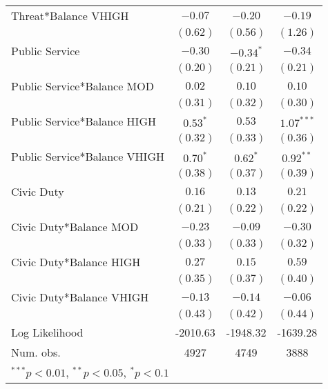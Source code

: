 \documentclass[12pt,titlepage]{article}
\begin{document}
\begin{table}[htbp]
\begin{center}
\begin{tabular}{|l|c|c|c|}
Threat*Balance VHIGH         & $-0.07$       & $-0.20$       & $-0.19$       \\
                             & $(0.62)$      & $(0.56)$      & $(1.26)$      \\
Public Service               & $-0.30$       & $-0.34^{*}$   & $-0.34$       \\
                             & $(0.20)$      & $(0.21)$      & $(0.21)$      \\
Public Service*Balance MOD   & $0.02$        & $0.10$        & $0.10$        \\
                             & $(0.31)$      & $(0.32)$      & $(0.30)$      \\
Public Service*Balance HIGH  & $0.53^{*}$    & $0.53$        & $1.07^{***}$  \\
                             & $(0.32)$      & $(0.33)$      & $(0.36)$      \\
Public Service*Balance VHIGH & $0.70^{*}$    & $0.62^{*}$    & $0.92^{**}$   \\
                             & $(0.38)$      & $(0.37)$      & $(0.39)$      \\
Civic Duty                   & $0.16$        & $0.13$        & $0.21$        \\
                             & $(0.21)$      & $(0.22)$      & $(0.22)$      \\
Civic Duty*Balance MOD       & $-0.23$       & $-0.09$       & $-0.30$       \\
                             & $(0.33)$      & $(0.33)$      & $(0.32)$      \\
Civic Duty*Balance HIGH      & $0.27$        & $0.15$        & $0.59$        \\
                             & $(0.35)$      & $(0.37)$      & $(0.40)$      \\
Civic Duty*Balance VHIGH     & $-0.13$       & $-0.14$       & $-0.06$       \\
                             & $(0.43)$      & $(0.42)$      & $(0.44)$      \\
\hline
Log Likelihood               & -2010.63      & -1948.32      & -1639.28      \\
Num. obs.                    & 4927          & 4749          & 3888          \\
\hline
\multicolumn{4}{l}{\scriptsize{$^{***}p<0.01$, $^{**}p<0.05$, $^*p<0.1$}}
\end{tabular}
\label{table:ep_log_II}
\end{center}
\end{table}
\end{document}

